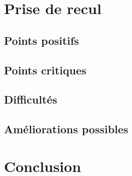 \documentclass[UTF8]{EPURapport}
\begin{document}
\chapter{Prise de recul}

\section{Points positifs}

\section{Points critiques}

\section{Difficultés}

\section{Améliorations possibles}

\chapter{Conclusion}

\annexes
\end{document}
